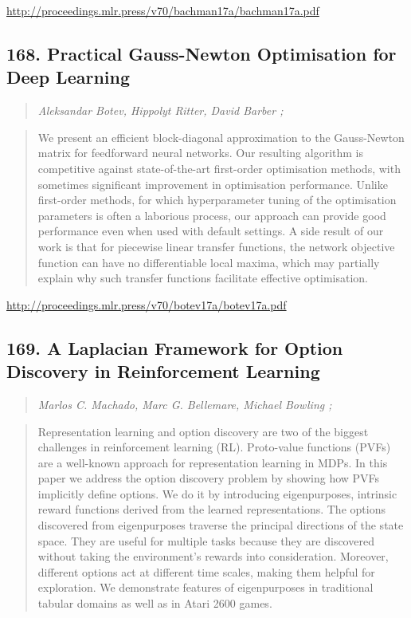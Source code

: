 \documentclass{article}
\begin{document}
\href{http://proceedings.mlr.press/v70/bachman17a/bachman17a.pdf}{http://proceedings.mlr.press/v70/bachman17a/bachman17a.pdf}

\subsection{168. Practical Gauss-Newton Optimisation for Deep Learning}

\begin{quote}
\footnotesize{\textit{Aleksandar Botev, Hippolyt Ritter, David Barber ;}}
\end{quote}

\begin{quote}
    We present an efficient block-diagonal approximation to the Gauss-Newton matrix for feedforward neural networks. Our resulting algorithm is competitive against state-of-the-art first-order optimisation methods, with sometimes significant improvement in optimisation performance. Unlike first-order methods, for which hyperparameter tuning of the optimisation parameters is often a laborious process, our approach can provide good performance even when used with default settings. A side result of our work is that for piecewise linear transfer functions, the network objective function can have no differentiable local maxima, which may partially explain why such transfer functions facilitate effective optimisation.  \end{quote}

\href{http://proceedings.mlr.press/v70/botev17a/botev17a.pdf}{http://proceedings.mlr.press/v70/botev17a/botev17a.pdf}

\subsection{169. A Laplacian Framework for Option Discovery in Reinforcement Learning}

\begin{quote}
\footnotesize{\textit{Marlos C. Machado, Marc G. Bellemare, Michael Bowling ;}}
\end{quote}

\begin{quote}
    Representation learning and option discovery are two of the biggest challenges in reinforcement learning (RL). Proto-value functions (PVFs) are a well-known approach for representation learning in MDPs. In this paper we address the option discovery problem by showing how PVFs implicitly define options. We do it by introducing eigenpurposes, intrinsic reward functions derived from the learned representations. The options discovered from eigenpurposes traverse the principal directions of the state space. They are useful for multiple tasks because they are discovered without taking the environment’s rewards into consideration. Moreover, different options act at different time scales, making them helpful for exploration. We demonstrate features of eigenpurposes in traditional tabular domains as well as in Atari 2600 games.  \end{quote}
\end{document}
